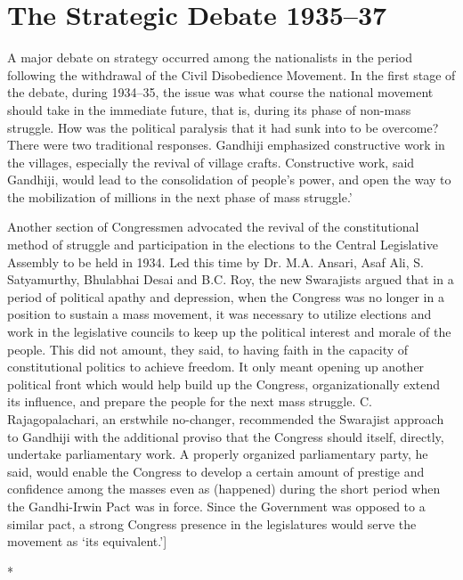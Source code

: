 \chapter{The Strategic Debate 1935--37}\label{chapter:CH25}
\begin{multicols}{2}

A major debate on strategy occurred among the nationalists in the period following the withdrawal of the Civil Disobedience Movement. In the first stage of the debate, during 1934--35, the issue was what course the national movement should take in the immediate future, that is, during its phase of non-mass struggle. How was the political paralysis that it had sunk into to be overcome? There were two traditional responses. Gandhiji emphasized constructive work in the villages, especially the revival of village crafts. Constructive work, said Gandhiji, would lead to the consolidation of people's power, and open the way to the mobilization of millions in the next phase of mass struggle.' 

Another section of Congressmen advocated the revival of the constitutional method of struggle and participation in the elections to the Central Legislative Assembly to be held in 1934. Led this time by Dr. M.A. Ansari, Asaf Ali, S. Satyamurthy, Bhulabhai Desai and B.C. Roy, the new Swarajists argued that in a period of political apathy and depression, when the Congress was no longer in a position to sustain a mass movement, it was necessary to utilize elections and work in the legislative councils to keep up the political interest and morale of the people. This did not amount, they said, to having faith in the capacity of constitutional politics to achieve freedom. It only meant opening up another political front which would help build up the Congress, organizationally extend its influence, and prepare the people for the next mass struggle. C. Rajagopalachari, an erstwhile no-changer, recommended the Swarajist approach to Gandhiji with the additional proviso that the Congress should itself, directly, undertake parliamentary work. A properly organized parliamentary party, he said, would enable the Congress to develop a certain amount of prestige and confidence among the masses even as (happened) during the short period when the Gandhi-Irwin Pact was in force. Since the Government was opposed to a similar pact, a strong Congress presence in the legislatures would serve the movement as `its equivalent.']

\begin{center}*\end{center}


\end{multicols}
